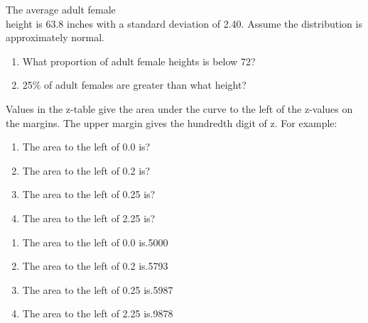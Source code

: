 \documentclass[11pt, chapterprefix=true]{scrbook}\usepackage[]{graphicx}\usepackage[]{color}
\begin{document}
\begin{exercises}
\begin{exercise}  %

The average adult female \\ height is 63.8 inches with a standard deviation of 2.40. Assume the distribution is approximately normal.

\begin{enumerate}
\item What proportion of adult female heights is below 72?
\item 25\% of adult females are greater than what height?
\end{enumerate}

  \end{exercise}



\begin{exercise} %

Values in the z-table give the area under the curve to the left of the z-values on the margins.  The upper margin gives the hundredth digit of z.  For example:

\begin{enumerate}
\item The area to the left of 0.0 is?
\item The area to the left of 0.2 is?
\item The area to the left of 0.25 is?
\item The area to the left of 2.25 is?
\end{enumerate}

	\end{exercise}
\begin{solution}  %

\begin{enumerate}
\item The area to the left of 0.0 is.5000
\item The area to the left of 0.2 is.5793
\item The area to the left of 0.25 is.5987
\item The area to the left of 2.25 is.9878
\end{enumerate}
\end{solution}


  \begin{exercise} %


\end{exercise}
\end{exercises}
\end{document}
